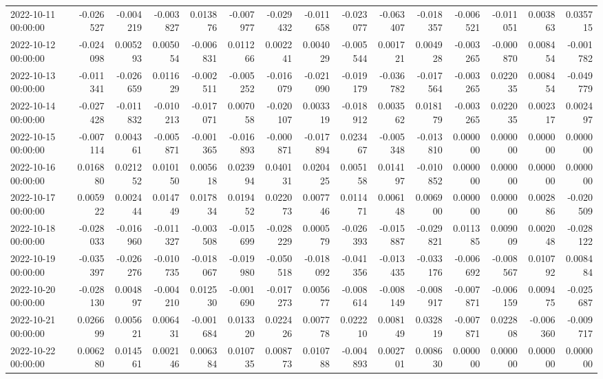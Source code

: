 \begin{tabular}{lrrrrrrrrrrrrrr}
2022-10-11 00:00:00 & -0.026527 & -0.004219 & -0.003827 & 0.013876 & -0.007977 & -0.029432 & -0.011658 & -0.023077 & -0.063407 & -0.018357 & -0.006521 & -0.011051 & 0.003863 & 0.035715 \\
2022-10-12 00:00:00 & -0.024098 & 0.005293 & 0.005054 & -0.006831 & 0.011266 & 0.002241 & 0.004029 & -0.005544 & 0.001721 & 0.004928 & -0.003265 & -0.000870 & 0.008454 & -0.001782 \\
2022-10-13 00:00:00 & -0.011341 & -0.026659 & 0.011629 & -0.002511 & -0.005252 & -0.016079 & -0.021090 & -0.019179 & -0.036782 & -0.017564 & -0.003265 & 0.022035 & 0.008454 & -0.049779 \\
2022-10-14 00:00:00 & -0.027428 & -0.011832 & -0.010213 & -0.017071 & 0.007058 & -0.020107 & 0.003319 & -0.018912 & 0.003562 & 0.018179 & -0.003265 & 0.022035 & 0.002317 & 0.002497 \\
2022-10-15 00:00:00 & -0.007114 & 0.004361 & -0.005871 & -0.001365 & -0.016893 & -0.000871 & -0.017894 & 0.023467 & -0.005348 & -0.013810 & 0.000000 & 0.000000 & 0.000000 & 0.000000 \\
2022-10-16 00:00:00 & 0.016880 & 0.021252 & 0.010150 & 0.005618 & 0.023994 & 0.040131 & 0.020425 & 0.005158 & 0.014197 & -0.010852 & 0.000000 & 0.000000 & 0.000000 & 0.000000 \\
2022-10-17 00:00:00 & 0.005922 & 0.002444 & 0.014749 & 0.017834 & 0.019452 & 0.022073 & 0.007746 & 0.011471 & 0.006148 & 0.006900 & 0.000000 & 0.000000 & 0.002886 & -0.020509 \\
2022-10-18 00:00:00 & -0.028033 & -0.016960 & -0.011327 & -0.003508 & -0.015699 & -0.028229 & 0.000579 & -0.026393 & -0.015887 & -0.029821 & 0.011385 & 0.009009 & 0.002048 & -0.028122 \\
2022-10-19 00:00:00 & -0.035397 & -0.026276 & -0.010735 & -0.018067 & -0.019980 & -0.050518 & -0.018092 & -0.041356 & -0.013435 & -0.033176 & -0.006692 & -0.008567 & 0.010792 & 0.008484 \\
2022-10-20 00:00:00 & -0.028130 & 0.004897 & -0.004210 & 0.012530 & -0.001690 & -0.017273 & 0.005677 & -0.008614 & -0.008149 & -0.008917 & -0.007871 & -0.006159 & 0.009475 & -0.025687 \\
2022-10-21 00:00:00 & 0.026699 & 0.005621 & 0.006431 & -0.001684 & 0.013320 & 0.022426 & 0.007778 & 0.022210 & 0.008149 & 0.032819 & -0.007871 & 0.022808 & -0.006360 & -0.009717 \\
2022-10-22 00:00:00 & 0.006280 & 0.014561 & 0.002146 & 0.006384 & 0.010735 & 0.008773 & 0.010788 & -0.004893 & 0.002701 & 0.008630 & 0.000000 & 0.000000 & 0.000000 & 0.000000 \\

\end{tabular}
